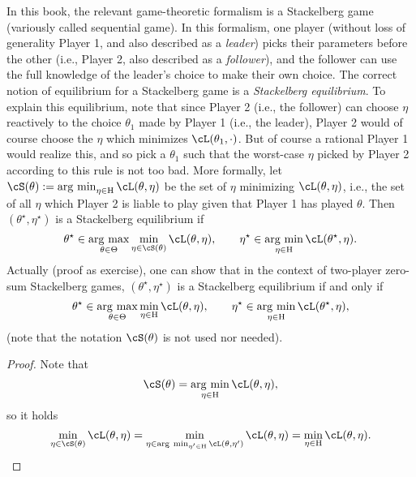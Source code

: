 \documentclass[../../book-main.tex]{subfiles}
\begin{document}
In this book, the relevant game-theoretic formalism is a Stackelberg game (variously called sequential game). In this formalism, one player (without loss of generality Player 1, and also described as a \textit{leader}) picks their parameters before the other (i.e., Player 2, also described as a \textit{follower}), and the follower can use the full knowledge of the leader's choice to make their own choice. The correct notion of equilibrium for a Stackelberg game is a \textit{Stackelberg equilibrium}. To explain this equilibrium, note that since Player 2 (i.e., the follower) can choose \(\eta\) reactively to the choice \(\theta_{1}\) made by Player 1 (i.e., the leader), Player 2 would of course choose the \(\eta\) which minimizes \(\cL(\theta_{1}, \cdot)\). But of course a rational Player 1 would realize this, and so pick a \(\theta_{1}\) such that the worst-case \(\eta\) picked by Player 2 according to this rule is not too bad. More formally, let \(\cS(\theta) := \argmin_{\eta \in \Eta}\cL(\theta, \eta)\) be the set of \(\eta\) minimizing \(\cL(\theta, \eta)\), i.e., the set of all \(\eta\) which Player 2 is liable to play given that Player 1 has played \(\theta\). Then \((\theta^{\star}, \eta^{\star})\) is a Stackelberg equilibrium if 
\begin{equation}
    \theta^{\star} \in \argmax_{\theta \in \Theta}\min_{\eta \in \cS(\theta)}\cL(\theta, \eta), \qquad \eta^{\star} \in \argmin_{\eta  \in \Eta}\cL(\theta^{\star}, \eta).
\end{equation}
Actually (proof as exercise), one can show that in the context of two-player zero-sum Stackelberg games, \((\theta^{\star}, \eta^{\star})\) is a Stackelberg equilibrium if and only if
\begin{equation}
    \theta^{\star} \in \argmax_{\theta \in \Theta}\min_{\eta \in \Eta}\cL(\theta, \eta), \qquad \eta^{\star} \in \argmin_{\eta  \in \Eta}\cL(\theta^{\star}, \eta),
\end{equation}
(note that the notation \(\cS(\theta)\) is not used nor needed). 
\begin{proof} 
    Note that 
    \begin{equation}
        \cS(\theta) = \argmin_{\eta \in \Eta}\cL(\theta, \eta),
    \end{equation}
    so it holds 
    \begin{equation}
        \min_{\eta \in \cS(\theta)}\cL(\theta, \eta) = \min_{\eta \in \argmin_{\eta^{\prime} \in \Eta}\cL(\theta, \eta^{\prime})}\cL(\theta, \eta) = \min_{\eta \in \Eta}\cL(\theta, \eta).
    \end{equation}
\end{proof}
\end{document}
